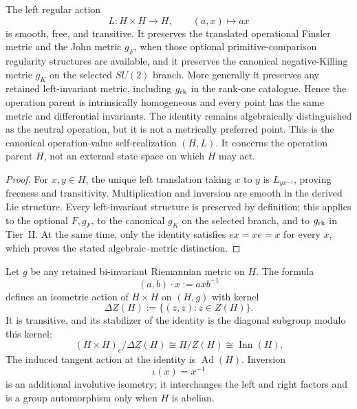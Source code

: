 \documentclass[11pt,a4paper]{article}
\begin{document}
\begin{theorem}
\label{p2:thm:regular-homogeneity-closure}
\label{p2:cor:homogeneity-from-transfer-group}
\label{p2:prop:homogeneity-derived}
The left regular action
\[
 L:H\times H\longrightarrow H,\qquad (a,x)\longmapsto ax
\]
is smooth, free, and transitive.  It preserves the translated operational
Finsler metric and the John metric \(g_F\), when those optional
primitive-comparison regularity structures are available, and it preserves
the canonical negative-Killing metric \(g_K\) on the selected \(SU(2)\)
branch.  More generally it preserves any retained left-invariant metric,
including \(g_{\rm rk}\) in the rank-one catalogue.  Hence the operation
parent is intrinsically homogeneous and every point has the same metric and
differential invariants.  The identity remains algebraically distinguished
as the neutral operation, but it is not a metrically preferred point.
This is the canonical operation-value self-realization \((H,L)\).  It
concerns the operation parent \(H\), not an external state space on which
\(H\) may act.
\end{theorem}

\begin{proof}
For \(x,y\in H\), the unique left translation taking \(x\) to \(y\) is
\(L_{yx^{-1}}\), proving freeness and transitivity.  Multiplication and
inversion are smooth in the derived Lie structure.  Every left-invariant
structure is preserved by definition; this applies to the optional
\(F,g_F\), to the canonical \(g_K\) on the selected branch, and to
\(g_{\rm rk}\) in Tier~II.  At the same
time, only the identity satisfies
\(ex=xe=x\) for every \(x\), which proves the stated algebraic--metric
distinction.
\end{proof}

\begin{theorem}
\label{p2:thm:left-right-isometry-action}
Let \(g\) be any retained bi-invariant Riemannian metric on \(H\).
The formula
\[
 (a,b)\cdot x:=axb^{-1}
\]
defines an isometric action of \(H\times H\) on
\((H,g)\) with kernel
\[
 \Delta Z(H):=\{(z,z):z\in Z(H)\}.
\]
It is transitive, and its stabilizer of the identity is the diagonal subgroup
modulo this kernel:
\[
 (H\times H)_e/\Delta Z(H)
 \cong H/Z(H)\cong\operatorname{Inn}(H).
\]
The induced tangent action at the identity is \(\operatorname{Ad}(H)\).
Inversion
\[
 \iota(x)=x^{-1}
\]
is an additional involutive isometry; it interchanges the left and right
factors and is a group automorphism only when \(H\) is abelian.
\end{theorem}
\end{document}
